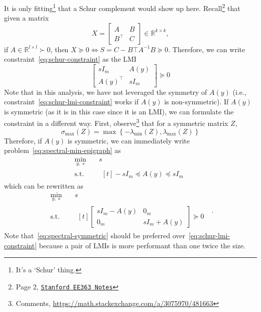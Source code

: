 \documentclass[a4paper]{article}
\begin{document}
It is only fitting\footnote{It's a `Schur' thing.} that a Schur complement would show up here.
Recall\footnote{Page 2, \href{https://stanford.edu/class/ee363/sessions/s4notes.pdf}{\texttt{Stanford EE363 Notes}}} that given a matrix
\begin{equation*}
X =
\begin{bmatrix}A&B\\B^\top&C\end{bmatrix}\in\mathbb{R}^{k\times k},
\end{equation*}
if $A\in\mathbb{R}^{l\times l}\succ0$, then $X\succeq0\iff S=C-B\top A^{-1}B\succeq0$.
Therefore, we can write constraint~\eqref{eq:schur-constraint} as the LMI
\begin{equation}\label{eq:schur-lmi-constraint}
\begin{bmatrix}sI_m&A(y)\\A(y)^\top&sI_m\end{bmatrix} \succeq 0
\end{equation}
Note that in this analysis, we have not leveraged the symmetry of $A(y)$ (i.e., constraint~\eqref{eq:schur-lmi-constraint} works if $A(y)$ is non-symmetric).
If $A(y)$ is symmetric (as it is in this case since it is an LMI), we can formulate the constraint in a different way.
First, observe\footnote{Comments, \url{https://math.stackexchange.com/a/3075970/481663}} that for a symmetric matrix $Z$,
\begin{equation}
\sigma_{\max}\left(Z\right) = \max\left\{ -\lambda_{\min}\left(Z\right), \lambda_{\max}\left(Z\right) \right\}
\end{equation}
Therefore, if $A(y)$ is symmetric, we can immediately write problem~\eqref{eq:spectral-min-epigraph} as
\begin{equation}
\begin{split}
\min_{y,\;s}   \quad & s \\
\textrm{s.t.} \quad &
  \begin{aligned}[t]
    -sI_m \preceq A(y) \preceq sI_m
  \end{aligned}
\end{split}
\end{equation}
which can be rewritten as
\begin{equation}\label{eq:spectral-symmetric}
\begin{split}
\min_{y,\;s}   \quad & s \\
\textrm{s.t.} \quad &
  \begin{aligned}[t]
    \begin{bmatrix}sI_m-A(y)&0_m\\0_m&sI_m+A(y)\end{bmatrix} \succeq 0
  \end{aligned}
\end{split}\;.
\end{equation}
Note that~\eqref{eq:spectral-symmetric} should be preferred over~\eqref{eq:schur-lmi-constraint} because a pair of LMIs is more performant than one twice the size.


\end{document}
